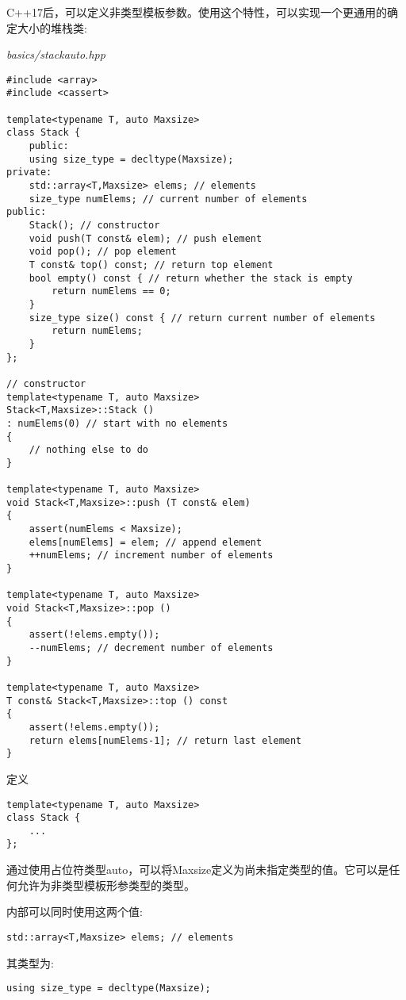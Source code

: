 C++17后，可以定义非类型模板参数。使用这个特性，可以实现一个更通用的确定大小的堆栈类:

\noindent
\textit{basics/stackauto.hpp}
\begin{lstlisting}[style=styleCXX]
#include <array>
#include <cassert>

template<typename T, auto Maxsize>
class Stack {
	public:
	using size_type = decltype(Maxsize);
private:
	std::array<T,Maxsize> elems; // elements
	size_type numElems; // current number of elements
public:
	Stack(); // constructor
	void push(T const& elem); // push element
	void pop(); // pop element
	T const& top() const; // return top element
	bool empty() const { // return whether the stack is empty
		return numElems == 0;
	}
	size_type size() const { // return current number of elements
		return numElems;
	}
};

// constructor
template<typename T, auto Maxsize>
Stack<T,Maxsize>::Stack ()
: numElems(0) // start with no elements
{
	// nothing else to do
}

template<typename T, auto Maxsize>
void Stack<T,Maxsize>::push (T const& elem)
{
	assert(numElems < Maxsize);
	elems[numElems] = elem; // append element
	++numElems; // increment number of elements
}

template<typename T, auto Maxsize>
void Stack<T,Maxsize>::pop ()
{
	assert(!elems.empty());
	--numElems; // decrement number of elements
}

template<typename T, auto Maxsize>
T const& Stack<T,Maxsize>::top () const
{
	assert(!elems.empty());
	return elems[numElems-1]; // return last element
}
\end{lstlisting}

定义

\begin{lstlisting}[style=styleCXX]
template<typename T, auto Maxsize>
class Stack {
	...
};
\end{lstlisting}

通过使用占位符类型auto，可以将Maxsize定义为尚未指定类型的值。它可以是任何允许为非类型模板形参类型的类型。

内部可以同时使用这两个值:

\begin{lstlisting}[style=styleCXX]
std::array<T,Maxsize> elems; // elements
\end{lstlisting}

其类型为:

\begin{lstlisting}[style=styleCXX]
using size_type = decltype(Maxsize);
\end{lstlisting}

